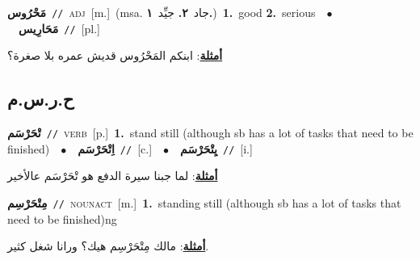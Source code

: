 \documentclass[10pt,a4paper,twoside]{article} %
\begin{document}
\begin{multicols}{2}
{\setlength\topsep{0pt}\textbf{\foreignlanguage{arabic}{مَحْرُوس}}\ {\color{gray}\texttt{//}\color{black}}\ \textsc{adj}\ [m.]\ \color{gray}(msa. \foreignlanguage{arabic}{جاد}~\foreignlanguage{arabic}{\textbf{٢.}}  \foreignlanguage{arabic}{جيِّد}~\foreignlanguage{arabic}{\textbf{١.}})\color{black}\ \textbf{1.}~good  \textbf{2.}~serious\ \ $\bullet$\ \ \setlength\topsep{0pt}\textbf{\foreignlanguage{arabic}{مَحَارِيس}}\ {\color{gray}\texttt{//}\color{black}}\ [pl.]\  \begin{flushright}\color{gray}\foreignlanguage{arabic}{\textbf{\underline{\foreignlanguage{arabic}{أمثلة}}}: ابنكم المَحْرُوس قديش عمره بلا صغرة؟}\end{flushright}\color{black}} \vspace{2mm}

\vspace{-3mm}
\subsection*{\color{blue}\foreignlanguage{arabic}{ح.ر.س.م}\color{blue}{}} 

{\setlength\topsep{0pt}\textbf{\foreignlanguage{arabic}{تْحَرْسَم}}\ {\color{gray}\texttt{//}\color{black}}\ \textsc{verb}\ [p.]\ \textbf{1.}~stand still (although sb has a lot of tasks that need to be finished)\ \ $\bullet$\ \ \setlength\topsep{0pt}\textbf{\foreignlanguage{arabic}{اِتْحَرْسَم}}\ {\color{gray}\texttt{//}\color{black}}\ [c.]\ \ $\bullet$\ \ \setlength\topsep{0pt}\textbf{\foreignlanguage{arabic}{يِتْحَرْسَم}}\ {\color{gray}\texttt{//}\color{black}}\ [i.]\  \begin{flushright}\color{gray}\foreignlanguage{arabic}{\textbf{\underline{\foreignlanguage{arabic}{أمثلة}}}: لما جبنا سيرة الدفع هو تْحَرْسَم عالأخير}\end{flushright}\color{black}} \vspace{2mm}

{\setlength\topsep{0pt}\textbf{\foreignlanguage{arabic}{مِتْحَرْسِم}}\ {\color{gray}\texttt{//}\color{black}}\ \textsc{noun\textunderscore act}\ [m.]\ \textbf{1.}~standing still (although sb has a lot of tasks that need to be finished)ng\  \begin{flushright}\color{gray}\foreignlanguage{arabic}{\textbf{\underline{\foreignlanguage{arabic}{أمثلة}}}: مالك مِتْحَرْسِم هيك؟ ورانا شغل كثير.}\end{flushright}\color{black}} \vspace{2mm}


\end{multicols}
\end{document}

